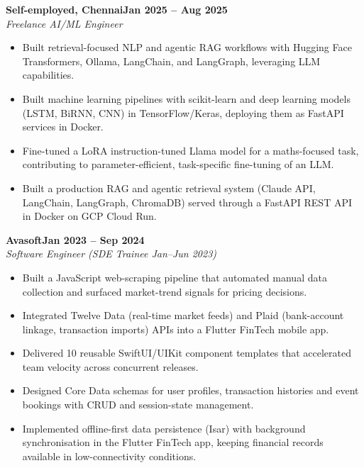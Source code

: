 \documentclass[a4paper,11pt]{article}
\newcommand{\entry}[4]{\needspace{4\baselineskip}\noindent\textbf{#1}\hfill\textbf{#2}\\ \textit{#3}\hfill\textit{#4}\par}
\begin{document}
\vspace{4pt}
\entry{Self-employed, Chennai}{Jan 2025 – Aug 2025}{Freelance AI/ML Engineer}{}
\begin{itemize}
  \item Built retrieval-focused NLP and agentic RAG workflows with Hugging Face Transformers, Ollama, LangChain, and LangGraph, leveraging LLM capabilities.
  \item Built machine learning pipelines with scikit-learn and deep learning models (LSTM, BiRNN, CNN) in TensorFlow/Keras, deploying them as FastAPI services in Docker.
  \item Fine-tuned a LoRA instruction-tuned Llama model for a maths-focused task, contributing to parameter-efficient, task-specific fine-tuning of an LLM.
  \item Built a production RAG and agentic retrieval system (Claude API, LangChain, LangGraph, ChromaDB) served through a FastAPI REST API in Docker on GCP Cloud Run.
\end{itemize}
\vspace{4pt}
\entry{Avasoft}{Jan 2023 – Sep 2024}{Software Engineer (SDE Trainee Jan–Jun 2023)}{}
\begin{itemize}
  \item Built a JavaScript web-scraping pipeline that automated manual data collection and surfaced market-trend signals for pricing decisions.
  \item Integrated Twelve Data (real-time market feeds) and Plaid (bank-account linkage, transaction imports) APIs into a Flutter FinTech mobile app.
  \item Delivered 10 reusable SwiftUI/UIKit component templates that accelerated team velocity across concurrent releases.
  \item Designed Core Data schemas for user profiles, transaction histories and event bookings with CRUD and session-state management.
  \item Implemented offline-first data persistence (Isar) with background synchronisation in the Flutter FinTech app, keeping financial records available in low-connectivity conditions.
\end{itemize}

\end{document}
